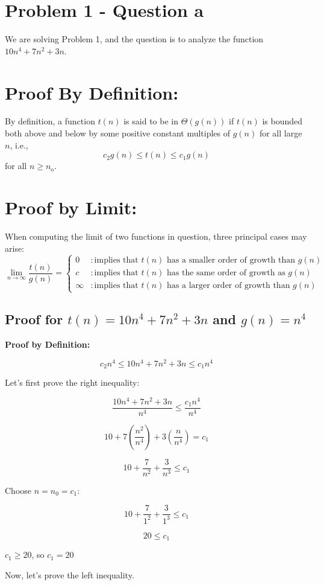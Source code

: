 \documentclass{article}
\begin{document}
\section*{Problem 1 - Question a}
We are solving Problem 1, and the question is to analyze the function \(10n^4 + 7n^2 + 3n\).

\section*{Proof By Definition:}
By definition, a function \(t(n)\) is said to be in \(\Theta(g(n))\) if \(t(n)\) is bounded both above and below by some positive constant multiples of \(g(n)\) for all large \(n\), i.e.,
\[ c_2 g(n) \leq t(n) \leq c_1 g(n) \]
for all \(n \geq n_{\text{o}}\).

\section*{Proof by Limit:}
When computing the limit of two functions in question, three principal cases may arise:
\[
\lim_{{n \to \infty}} \frac{t(n)}{g(n)} =
\begin{cases}
0 & : \text{implies that } t(n) \text{ has a smaller order of growth than } g(n) \\
c & : \text{implies that } t(n) \text{ has the same order of growth as } g(n) \\
\infty & : \text{implies that } t(n) \text{ has a larger order of growth than } g(n)
\end{cases}
\]

\subsection*{Proof for \(t(n) = 10n^4 + 7n^2 + 3n\) and \(g(n) = n^4\)}

\textbf{Proof by Definition:}

\[ c_2n^4 \leq 10n^4 + 7n^2 + 3n \leq c_1n^4 \]

Let's first prove the right inequality:

\[ \frac{10n^4 + 7n^2 + 3n}{n^4} \leq \frac{c_1n^4}{n^4} \]

\[ 10 + 7\left(\frac{n^2}{n^4}\right) + 3\left(\frac{n}{n^4}\right) = c_1 \]

\[ 10 + \frac{7}{n^2} + \frac{3}{n^3} \leq c_1 \]

Choose \(n = n_0 = c_1\):

\[ 10 + \frac{7}{1^2} + \frac{3}{1^3} \leq c_1 \]

\[ 20 \leq c_1 \]

\(c_1 \geq 20\), so \(c_1 = 20\)

Now, let's prove the left inequality.
\end{document}
